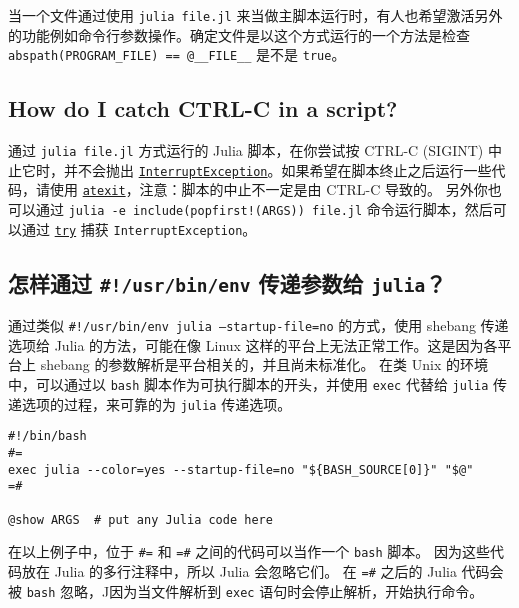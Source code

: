 当一个文件通过使用 \texttt{julia file.jl} 来当做主脚本运行时，有人也希望激活另外的功能例如命令行参数操作。确定文件是以这个方式运行的一个方法是检查 \texttt{abspath(PROGRAM\_FILE) == @\_\_FILE\_\_} 是不是 \texttt{true}。



\hypertarget{5414221961728470242}{}


\subsection{How do I catch CTRL-C in a script?}



通过 \texttt{julia file.jl} 方式运行的 Julia 脚本，在你尝试按 CTRL-C (SIGINT) 中止它时，并不会抛出 \hyperlink{11255134339055983338}{\texttt{InterruptException}}。如果希望在脚本终止之后运行一些代码，请使用 \hyperlink{17479944696971324992}{\texttt{atexit}}，注意：脚本的中止不一定是由 CTRL-C 导致的。 另外你也可以通过 \texttt{julia -e {\textquotesingle}include(popfirst!(ARGS)){\textquotesingle} file.jl} 命令运行脚本，然后可以通过 \hyperlink{16338536928035025961}{\texttt{try}} 捕获 \texttt{InterruptException}。



\hypertarget{15272704088350857853}{}


\subsection{怎样通过 \texttt{\#!/usr/bin/env} 传递参数给 \texttt{julia}？}



通过类似 \texttt{\#!/usr/bin/env julia --startup-file=no} 的方式，使用 shebang 传递选项给 Julia 的方法，可能在像 Linux 这样的平台上无法正常工作。这是因为各平台上 shebang 的参数解析是平台相关的，并且尚未标准化。 在类 Unix 的环境中，可以通过以 \texttt{bash} 脚本作为可执行脚本的开头，并使用 \texttt{exec} 代替给 \texttt{julia} 传递选项的过程，来可靠的为 \texttt{julia} 传递选项。




\begin{verbatim}
#!/bin/bash
#=
exec julia --color=yes --startup-file=no "${BASH_SOURCE[0]}" "$@"
=#

@show ARGS  # put any Julia code here
\end{verbatim}



在以上例子中，位于 \texttt{\#=} 和 \texttt{=\#} 之间的代码可以当作一个 \texttt{bash} 脚本。 因为这些代码放在 Julia 的多行注释中，所以 Julia 会忽略它们。 在 \texttt{=\#} 之后的 Julia 代码会被 \texttt{bash} 忽略，J因为当文件解析到 \texttt{exec} 语句时会停止解析，开始执行命令。



